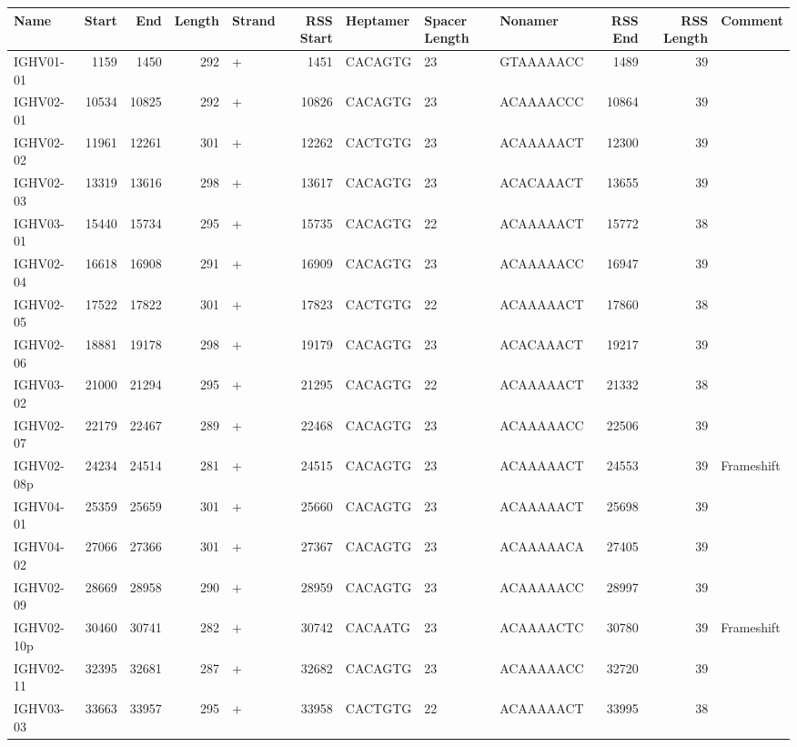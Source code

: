 \begin{tabular}{lrrrlrlllrrl}
  \toprule Name & Start & End & Length & Strand & RSS Start & Heptamer & Spacer Length & Nonamer & RSS End & RSS Length & Comment \\ 
  \midrule IGHV01-01 & 1159 & 1450 & 292 & + & 1451 & CACAGTG & 23 & GTAAAAACC & 1489 & 39 &  \\ 
  IGHV02-01 & 10534 & 10825 & 292 & + & 10826 & CACAGTG & 23 & ACAAAACCC & 10864 & 39 &  \\ 
  IGHV02-02 & 11961 & 12261 & 301 & + & 12262 & CACTGTG & 23 & ACAAAAACT & 12300 & 39 &  \\ 
  IGHV02-03 & 13319 & 13616 & 298 & + & 13617 & CACAGTG & 23 & ACACAAACT & 13655 & 39 &  \\ 
  IGHV03-01 & 15440 & 15734 & 295 & + & 15735 & CACAGTG & 22 & ACAAAAACT & 15772 & 38 &  \\ 
  IGHV02-04 & 16618 & 16908 & 291 & + & 16909 & CACAGTG & 23 & ACAAAAACC & 16947 & 39 &  \\ 
  IGHV02-05 & 17522 & 17822 & 301 & + & 17823 & CACTGTG & 22 & ACAAAAACT & 17860 & 38 &  \\ 
  IGHV02-06 & 18881 & 19178 & 298 & + & 19179 & CACAGTG & 23 & ACACAAACT & 19217 & 39 &  \\ 
  IGHV03-02 & 21000 & 21294 & 295 & + & 21295 & CACAGTG & 22 & ACAAAAACT & 21332 & 38 &  \\ 
  IGHV02-07 & 22179 & 22467 & 289 & + & 22468 & CACAGTG & 23 & ACAAAAACC & 22506 & 39 &  \\ 
  IGHV02-08p & 24234 & 24514 & 281 & + & 24515 & CACAGTG & 23 & ACAAAAACT & 24553 & 39 & Frameshift \\ 
  IGHV04-01 & 25359 & 25659 & 301 & + & 25660 & CACAGTG & 23 & ACAAAAACT & 25698 & 39 &  \\ 
  IGHV04-02 & 27066 & 27366 & 301 & + & 27367 & CACAGTG & 23 & ACAAAAACA & 27405 & 39 &  \\ 
  IGHV02-09 & 28669 & 28958 & 290 & + & 28959 & CACAGTG & 23 & ACAAAAACC & 28997 & 39 &  \\ 
  IGHV02-10p & 30460 & 30741 & 282 & + & 30742 & CACAATG & 23 & ACAAAACTC & 30780 & 39 & Frameshift \\ 
  IGHV02-11 & 32395 & 32681 & 287 & + & 32682 & CACAGTG & 23 & ACAAAAACC & 32720 & 39 &  \\ 
  IGHV03-03 & 33663 & 33957 & 295 & + & 33958 & CACTGTG & 22 & ACAAAAACT & 33995 & 38 &  \\ 

\end{tabular}
